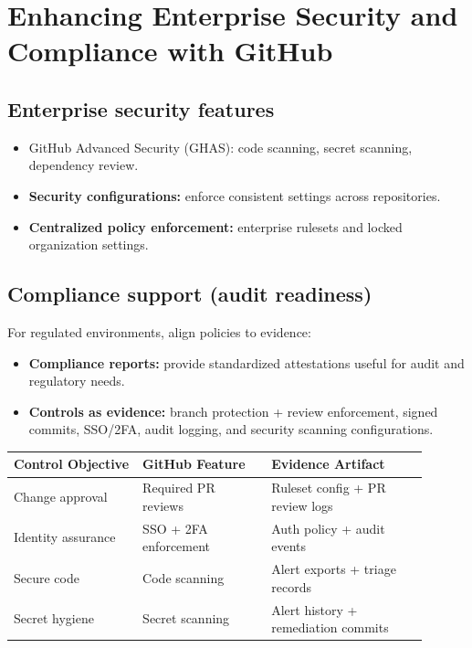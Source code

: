 \documentclass[11pt]{article}
\newcommand{\ghas}{\textsf{GitHub Advanced Security (GHAS)}}
\begin{document}
\section{Enhancing Enterprise Security and Compliance with GitHub}

\subsection{Enterprise security features}
\begin{itemize}[leftmargin=*,itemsep=2pt]
  \item \ghas: code scanning, secret scanning, dependency review.
  \item \textbf{Security configurations:} enforce consistent settings across repositories.
  \item \textbf{Centralized policy enforcement:} enterprise rulesets and locked organization settings.
\end{itemize}

\subsection{Compliance support (audit readiness)}
For regulated environments, align policies to evidence:

\begin{itemize}[leftmargin=*,itemsep=2pt]
  \item \textbf{Compliance reports:} provide standardized attestations useful for audit and regulatory needs.
  \item \textbf{Controls as evidence:} branch protection + review enforcement, signed commits, SSO/2FA, audit logging, and security scanning configurations.
\end{itemize}

\begin{examplebox}[title={Example: ``Control-to-evidence'' mapping excerpt}]
\begin{tabular}{@{}p{0.28\linewidth}p{0.28\linewidth}p{0.34\linewidth}@{}}
\toprule
\textbf{Control Objective} & \textbf{GitHub Feature} & \textbf{Evidence Artifact} \\
\midrule
Change approval & Required PR reviews & Ruleset config + PR review logs \\
Identity assurance & SSO + 2FA enforcement & Auth policy + audit events \\
Secure code & Code scanning & Alert exports + triage records \\
Secret hygiene & Secret scanning & Alert history + remediation commits \\
\bottomrule
\end{tabular}
\end{examplebox}
\end{document}
